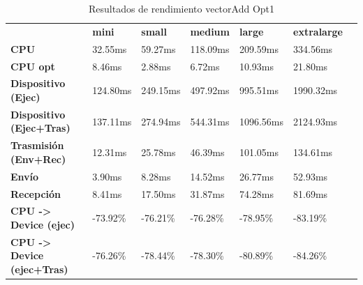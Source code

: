 \begin{table}[H]
    \centering
    \begin{tabular}{lllllll}
    \rowcolor[HTML]{DAE8FC} \ &  \textbf{mini} &  \textbf{small} &  \textbf{medium} &  \textbf{	large} &  \textbf{	extralarge} \\
    \cellcolor[HTML]{DAE8FC} \textbf{CPU} & 32.55ms & 59.27ms & 118.09ms & 	209.59ms & 	334.56ms \\
    \rowcolor[HTML]{EFEFEF} \cellcolor[HTML]{DAE8FC} \textbf{CPU opt} & 8.46ms & 2.88ms & 6.72ms & 	10.93ms & 	21.80ms \\
    \cellcolor[HTML]{DAE8FC} \textbf{Dispositivo (Ejec)} & 124.80ms & 249.15ms & 497.92ms & 	995.51ms & 	1990.32ms \\
    \rowcolor[HTML]{EFEFEF} \cellcolor[HTML]{DAE8FC} \textbf{Dispositivo (Ejec+Tras)} & 137.11ms & 274.94ms & 544.31ms & 	1096.56ms & 	2124.93ms \\
    \cellcolor[HTML]{DAE8FC} \textbf{Trasmisión (Env+Rec)} & 12.31ms & 25.78ms & 46.39ms & 	101.05ms & 	134.61ms \\
    \rowcolor[HTML]{EFEFEF} \cellcolor[HTML]{DAE8FC} \textbf{Envío} & 3.90ms & 8.28ms & 14.52ms & 	26.77ms & 	52.93ms \\
    \cellcolor[HTML]{DAE8FC} \textbf{Recepción} & 8.41ms & 17.50ms & 31.87ms & 	74.28ms & 	81.69ms \\
    \rowcolor[HTML]{EFEFEF} \cellcolor[HTML]{DAE8FC} \textbf{CPU -> Device (ejec)} & -73.92\% & -76.21\% & -76.28\% & 	-78.95\% & 	-83.19\% \\
    \cellcolor[HTML]{DAE8FC} \textbf{CPU -> Device (ejec+Tras)} & -76.26\% & -78.44\% & -78.30\% & 	-80.89\% & 	-84.26\% \\
    \end{tabular}
    \caption[Resultados de rendimiento vectorAdd Opt1]{{Resultados de rendimiento vectorAdd Opt1}}
    \label{table_test_vectorAdd_Opt1_hw_performanceResults}
\end{table}